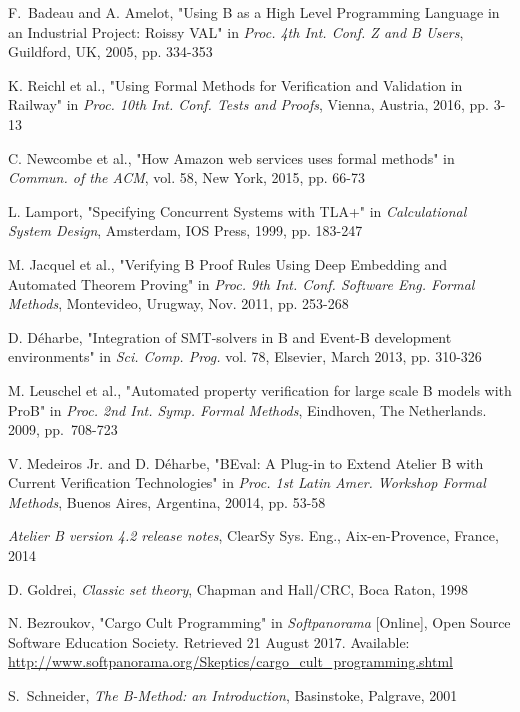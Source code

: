 \documentclass[11pt,journal]{IEEEtran}
\begin{document}
\begin{thebibliography}{2}
		F.~Badeau and A. Amelot, "Using B as a High Level Programming Language in an Industrial Project: Roissy VAL" in \emph{Proc. 4th Int. Conf. Z and B Users}, Guildford, UK, 2005, pp. 334-353
		
		K. Reichl et al., "Using Formal Methods for Verification and Validation in Railway" in \emph{Proc. 10th Int. Conf. Tests and Proofs}, Vienna, Austria, 2016, pp. 3-13
		
		C. Newcombe et al., "How Amazon web services uses formal methods" in \emph{Commun. of the ACM}, vol. 58, New York, 2015, pp. 66-73
		
		L. Lamport, "Specifying Concurrent Systems with TLA+" in \emph{Calculational System Design}, Amsterdam, IOS Press, 1999, pp. 183-247
		
		M. Jacquel et al., "Verifying B Proof Rules Using Deep Embedding and Automated Theorem Proving" in \emph{Proc. 9th Int. Conf. Software Eng. Formal Methods}, Montevideo, Urugway, Nov. 2011, pp. 253-268
		
		D. D\'{e}harbe, "Integration of SMT-solvers in B and Event-B development environments" in \emph{Sci. Comp. Prog.} vol. 78, Elsevier, March 2013, pp. 310-326
		
		M. Leuschel et al., "Automated property verification for large scale B models with ProB" in \emph{Proc. 2nd Int. Symp. Formal Methods}, Eindhoven, The Netherlands. 2009, pp.~708-723
		
		V. Medeiros Jr. and D. D\'{e}harbe, "BEval: A Plug-in to Extend Atelier B with Current Verification Technologies" in \emph{Proc. 1st Latin Amer. Workshop Formal Methods}, Buenos Aires, Argentina, 20014, pp. 53-58
		
		\emph{Atelier B version 4.2 release notes}, ClearSy Sys. Eng., Aix-en-Provence, France, 2014
		
		D. Goldrei, \emph{Classic set theory}, Chapman and Hall/CRC, Boca Raton, 1998
		
		N. Bezroukov, "Cargo Cult Programming" in \emph{Softpanorama} [Online],  Open Source Software Education Society. Retrieved 21 August 2017. Available: \url{http://www.softpanorama.org/Skeptics/cargo_cult_programming.shtml}
		
		S.~Schneider, \emph{The B-Method: an Introduction}, Basinstoke, Palgrave, 2001
		

\end{thebibliography}
\end{document}
